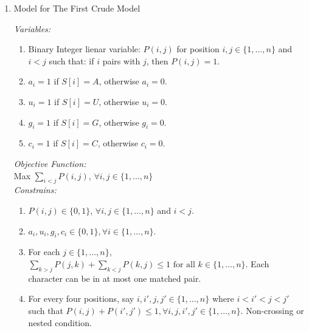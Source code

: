 \documentclass[11pt]{article}
\begin{document}
{\begin{enumerate}
\begin{enumerate}
    \item Weight of stacked quartet in nested pairing: Since stacking will enhance the stability of the folding, so we are awarding more weight to those stacked quartet according to the table given.
    \item We are also awarding more weight to a stacked quartet if it is the first or last quartet in a stack.
    \item We are allowing crossing pairs, and the number of maxmium crossing pairs is at most 10.
\end{enumerate}
\pagebreak

\item Model for The First Crude Model

\textit{Variables:}
\begin{enumerate}
    \item Binary Integer lienar variable: $P(i,j)$ for position $i,j\in \{1,\dots, n\}$ and $i < j$ such that: if $i$ pairs with $j$, then $P(i,j)=1$.
    \item $a_i = 1$ if $S[i] = A$, otherwise $a_i=0$.
    \item $u_i = 1$ if $S[i] = U$, otherwise $u_i=0$.
    \item $g_i = 1$ if $S[i] = G$, otherwise $g_i=0$.
    \item $c_i = 1$ if $S[i] = C$, otherwise $c_i=0$.
\end{enumerate}

\textit{Objective Function:}\\
Max $\sum_{i<j}P(i,j)$, $\forall i,j\in \{1,\dots, n\}$\\

\textit{Constrains:}
\begin{enumerate}
    \item $P(i,j)\in \{0,1\}$, $\forall i,j \in \{1,\dots, n\}$ and $i<j$.
    
    \item $a_i,u_i,g_i,c_i\in \{0,1\},\forall i\in \{1,\dots, n\}$.

    \item For each $j\in  \{1,\dots, n\}$, $\sum_{k>j}P(j,k)+\sum_{k<j}P(k,j)\leq 1 \textrm{ for all }k\in \{1,\dots, n\}$. Each character can be in at most one matched pair.
    
    \item For every four positions, say $i,i',j ,j'\in \{1,\dots, n\}$ where $i<i'<j<j'$ such that $P(i,j)+P(i',j')\leq 1, \forall i,j,i',j' \in \{1,\dots, n\}$. Non-crossing or nested condition.\\


\end{enumerate}
\end{enumerate}}
\end{document}
